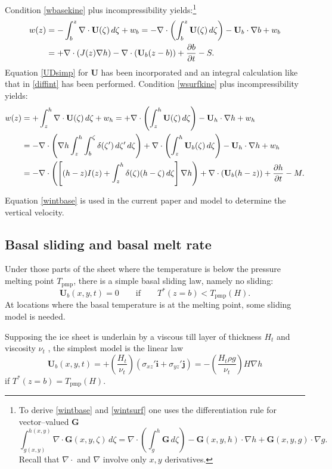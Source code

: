 \documentclass[12pt,final]{amsart}%
\theoremstyle{plain}
\theoremstyle{definition}
\theoremstyle{remark}
\newcommand{\ddt}[1]{\ensuremath{\frac{\partial #1}{\partial t}}}
\newcommand{\diverg}{\nabla\cdot}
\newcommand{\grad}{\nabla}
\newcommand{\ihat}{\mathbf{i}}
\newcommand{\jhat}{\mathbf{j}}
\newcommand{\Tpmp}{T_{\text{pmp}}}
\newcommand{\bG}{{\mathbf{G}}}
\newcommand{\bU}{{\mathbf{U}}}
\begin{document}
Condition \eqref{wbasekine} plus incompressibility yields:\footnote{To derive \eqref{wintbase} and \eqref{wintsurf} one uses the differentiation rule for vector--valued $\bG$
    $$\int_{g(x,y)}^{h(x,y)} \diverg \bG(x,y,\zeta)\,d\zeta = \diverg \left(\int_{g}^{h} \bG \,d\zeta\right)- \bG(x,y,h)\cdot \grad h + \bG(x,y,g)\cdot \grad g.$$
Recall that $\diverg$ and $\grad$ involve only $x,y$ derivatives.}
\begin{align}\label{wintbase}
w(z) &= -\int_{b}^z \diverg \bU(\zeta)\,d\zeta + w_b
= - \diverg\left(\int_{b}^z\bU(\zeta)\,d\zeta\right) - \bU_b\cdot\grad b +w_b \notag\\
&=+ \diverg\left(J(z) \grad h\right) - \diverg (\bU_b(z-b)) + \ddt{b} - S.
\end{align}
Equation \eqref{UDsimp} for $\bU$ has been incorporated and an integral calculation like that in \eqref{diffint} has been performed.  Condition \eqref{wsurfkine} plus incompressibility yields:
\begin{align}
w(z) &= +\int_{z}^h \diverg \bU(\zeta)\,d\zeta + w_h = + \diverg\left(\int_{z}^h\bU(\zeta)\,d\zeta\right) - \bU_h\cdot\grad h +w_h\notag\\
&= - \diverg\left(\grad h \int_{z}^h \int_b^\zeta \delta(\zeta')\,d\zeta'\,d\zeta\right) + \diverg\left(\int_{z}^h\bU_b(\zeta)\,d\zeta\right) - \bU_h\cdot\grad h +w_h \notag\\
\label{wintsurf}&= - \diverg\left(\left[(h-z)I(z) + \int_{z}^h\delta(\zeta)(h-\zeta)\,d\zeta\right] \grad h\right) + \diverg\left(\bU_b(h-z)\right) + \ddt{h} - M.\end{align}

Equation \eqref{wintbase} is used in the current paper and model to determine the vertical velocity.


\subsection*{Basal sliding and basal melt rate}\label{basalsubsect}  Under those parts of the sheet where the temperature is below the pressure melting point $\Tpmp$, there is a simple basal sliding law, namely no sliding:
    $$\bU_b(x,y,t)=0 \qquad \text{if} \qquad T^*(z=b)< \Tpmp(H).$$
At locations where the basal temperature is at the melting point, some sliding model is needed.

Supposing the ice sheet is underlain by a viscous till layer of thickness $H_t$ and viscosity $\nu_t$ \citep{LingleTroshina,MacAyeal}, the simplest model is the linear law
    $$\bU_b(x,y,t)=+\left(\frac{H_t}{\nu_t}\right) \left(\sigma_{xz}'\ihat+\sigma_{yz}'\jhat\right) = - \left(\frac{H_t \rho g}{\nu_t}\right)  H \grad h$$
if $T^*(z=b)=\Tpmp(H)$.
\end{document}
